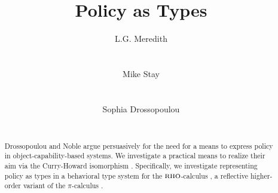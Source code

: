 \documentclass[]{acm_proc_article-sp}
\numberwithin{equation}{subsection}
\newcommand{\pic}{$\pi$-calculus}
\newcommand{\rhoc}{${\textsc{rho}}$-calculus}
\newcommand{\papertitle}{Policy as Types}
\begin{document}
\lstset{language=}

\setlength{\topmargin}{0in}
\setlength{\textheight}{8.5in}
\setlength{\parskip}{6pt}

\title{\papertitle}

\author{
\alignauthor 
L.G. Meredith\\
  \\
  \\
\alignauthor
Mike Stay\\
  \\
  \\
\alignauthor
Sophia Drossopoulou\\
  \\
}










\begin{abstract}
\normalsize{ 

  Drossopoulou and Noble \cite{Drossopoulou:2013:NCP:2489804.2489811}
  argue persuasively for the need for a means to express policy in
  object-capability-based systems. We investigate a practical means to
  realize their aim via the Curry-Howard isomorphism
  \cite{Abramsky:1992:PP:194588.194591}
  \cite{Krivine-TheCurryHowardCorre}. Specifically, we investigate
  representing policy as types in a behavioral type system for the
  \rhoc\; \cite{DBLP:conf/tgc/MeredithR05}, a reflective higher-order
  variant of the \pic\; \cite{milner91polyadicpi}.

}

\end{abstract}
\end{document}
